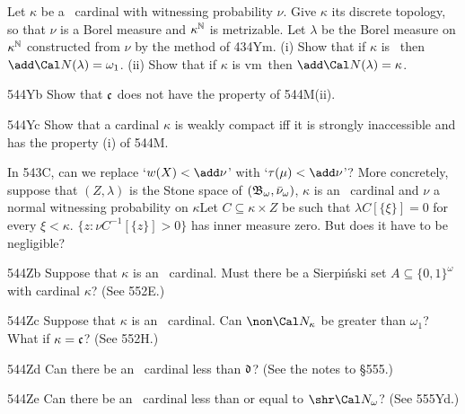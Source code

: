 {
Let $\kappa$ be a \rvm\ cardinal with witnessing
probability $\nu$.   Give $\kappa$ its discrete topology, so that $\nu$ is
a Borel measure and $\kappa^{\Bbb N}$ is metrizable.
Let $\lambda$ be the
Borel measure on $\kappa^{\Bbb N}$ constructed from $\nu$ by the method
of 434Ym.   (i) Show that if $\kappa$ is \am\ then
$\add\Cal N(\lambda)=\omega_1$.   (ii) Show that if $\kappa$ is \2vm\ then
$\add\Cal N(\lambda)=\kappa$.

\spheader 544Yb
Show that $\frak c$ does not have the property of 544M(ii).

\spheader 544Yc Show that a cardinal $\kappa$ is weakly compact iff it is
strongly inaccessible and has the property (i) of 544M.
}%

In 543C, can we replace `$w(X)<\add\nu$' with
`$\tau(\mu)<\add\nu$'?   More concretely, suppose that $(Z,\lambda)$ is the
Stone space of $(\frak B_{\omega},\bar\nu_{\omega})$, $\kappa$ is an \am\
cardinal and $\nu$ a
normal witnessing probability on $\kappa$Let
$C\subseteq\kappa\times Z$ be such that $\lambda C[\{\xi\}]=0$ for every
$\xi<\kappa$.   \cmmnt{By 544C, we know that}
$\{z:\nu C^{-1}[\{z\}]>0\}$ has inner
measure zero.   But does it have to be negligible?

\spheader 544Zb Suppose that $\kappa$ is an \am\ cardinal.
Must there be a Sierpi\'nski set $A\subseteq\{0,1\}^{\omega}$
with cardinal $\kappa$?   (See 552E.)

\spheader 544Zc Suppose that $\kappa$ is an \am\ cardinal.   Can
$\non\Cal N_{\kappa}$ be greater than $\omega_1$?   What if
$\kappa=\frak c$?   (See 552H.)

\spheader 544Zd Can there be an \am\ cardinal less than $\frak d$?
(See the notes to \S555.)

\spheader 544Ze Can there be an \am\ cardinal less than or equal to
$\shr\Cal N_{\omega}$?   (See 555Yd.)


